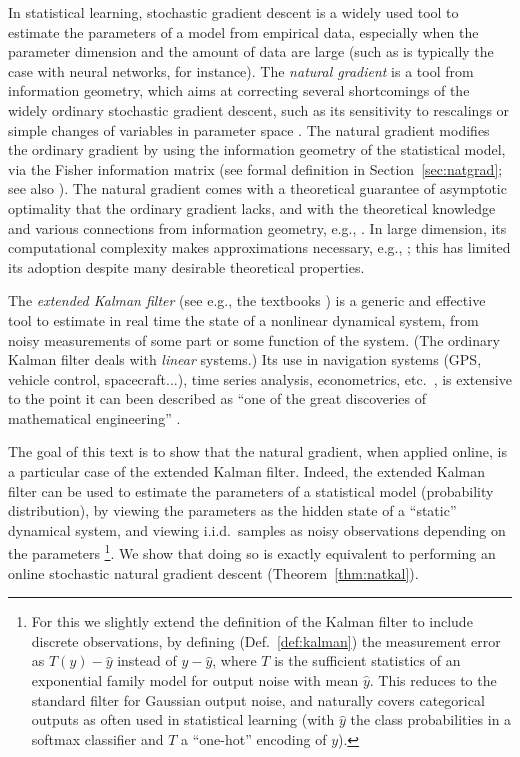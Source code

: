 \documentclass[11pt,a4paper]{article}
\newcommand{\1}{\mathbbm{1}}
\theoremstyle{yannthm}
\theoremstyle{yannthm2}
\numberwithin{equation}{section}
\begin{document}
In statistical learning, stochastic gradient descent is a widely used
tool to estimate the parameters of a model from empirical data,
especially when the parameter dimension and the amount of data are large
\cite{bottoulecun2003} (such as is typically the case with neural 
networks, for instance).
The \emph{natural gradient} \cite{Amari1998} is a tool from information
geometry, which aims at correcting several shortcomings of the widely
ordinary stochastic gradient descent, such as
its sensitivity to rescalings or simple changes of
variables in parameter space \cite{gradnn}. The natural gradient modifies the ordinary
gradient by using the information geometry of the statistical model, via
the Fisher information matrix (see formal definition in
Section~\ref{sec:natgrad}; see also \cite{martensnatgrad}). The natural gradient comes with a theoretical guarantee of
asymptotic optimality \cite{Amari1998} that the ordinary gradient lacks, and with the theoretical knowledge
and various connections from
information geometry, e.g., \cite{Amari2000book,igo}. In large dimension, its
computational complexity makes approximations
necessary, e.g.,
\cite{TONGA,gradnn,riemaNN,grosse2015scaling,martens2015optimizing};
this has limited its adoption despite many desirable
theoretical properties.

The \emph{extended Kalman filter} (see e.g., the textbooks
\cite{simon2006kalmanbook,sarkka_book,jazwinski_book}) is a generic and
effective tool to estimate in real
time the state of a nonlinear dynamical system, from noisy measurements
of some part or some function of the system.  (The ordinary Kalman filter
deals with \emph{linear} systems.) Its use in navigation systems (GPS,
vehicle control, spacecraft...), time series analysis, econometrics,
etc.\ \cite{sarkka_book},
is extensive  to the point it can been described as ``one of the great
discoveries of mathematical engineering'' \cite{kalmanmatlab}.

The goal of this text is to show that the natural gradient, when applied
online, is a particular case of the extended Kalman filter.  Indeed, the
extended Kalman filter can be used to estimate the parameters of a
statistical model (probability distribution), by viewing the parameters
as the hidden state of a ``static'' dynamical system, and viewing i.i.d.~samples
as noisy observations depending on the parameters \footnote{For this we
slightly extend the definition of the Kalman filter to include discrete
observations, by defining (Def.~\ref{def:kalman}) the measurement error as $T(y)-\hat y$
instead of $y-\hat y$, where $T$ is the sufficient statistics of an
exponential family model for output noise with mean $\hat y$. This reduces to the standard filter for Gaussian
output noise, and naturally covers categorical outputs as often used in
statistical learning (with $\hat y$ the class probabilities in a softmax
classifier and $T$ a ``one-hot'' encoding of $y$).}. We show that doing so
is exactly equivalent to performing an online stochastic natural gradient
descent (Theorem~\ref{thm:natkal}).
\end{document}
